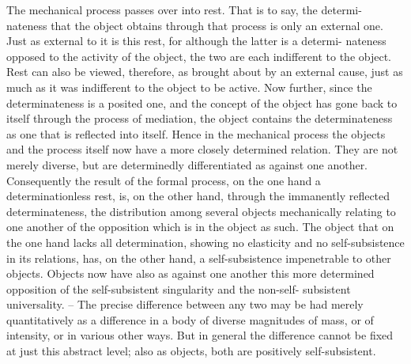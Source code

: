 The mechanical process passes over into rest. That is to say, the determi-
nateness that the object obtains through that process is only an external
one. Just as external to it is this rest, for although the latter is a determi-
nateness opposed to the activity of the object, the two are each indifferent
to the object. Rest can also be viewed, therefore, as brought about by an
external cause, just as much as it was indifferent to the object to be active.
Now further, since the determinateness is a posited one, and the concept
of the object has gone back to itself through the process of mediation, the
object contains the determinateness as one that is reflected into itself.
Hence in the mechanical process the objects and the process itself now
have a more closely determined relation. They are not merely diverse, but
are determinedly differentiated as against one another. Consequently the
result of the formal process, on the one hand a determinationless rest, is,
on the other hand, through the immanently reflected determinateness, the
distribution among several objects mechanically relating to one another of
the opposition which is in the object as such. The object that on the one
hand lacks all determination, showing no elasticity and no self-subsistence
in its relations, has, on the other hand, a self-subsistence impenetrable to
other objects. Objects now have also as against one another this more
determined opposition of the self-subsistent singularity and the non-self-
subsistent universality. – The precise difference between any two may be
had merely quantitatively as a difference in a body of diverse magnitudes of
mass, or of intensity, or in various other ways. But in general the difference
cannot be fixed at just this abstract level; also as objects, both are positively
self-subsistent.

